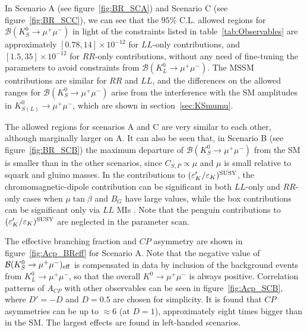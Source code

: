 In Scenario A (see figure~\ref{fig:BR_SCA}) and Scenario C (see figure~\ref{fig:BR_SCC}), we can see that the $95\%$ C.L. allowed regions for $\mathcal{B}(K_S^0\rightarrow\mu^+\mu^-)$ in light of the constraints listed in table~\ref{tab:Observables} are approximately $[0.78,14]\times 10^{-12}$ for $LL$-only contributions, and $[1.5,35]\times 10^{-12}$  for $RR$-only contributions, without any need of fine-tuning the parameters to avoid constraints from $\mathcal{B}(K_L^0\rightarrow\mu^+\mu^-)$. The MSSM contributions are similar for $RR$ and $LL$, and the differences on the allowed ranges for $\mathcal{B}(K_S^0\rightarrow\mu^+\mu^-)$ arise from  the interference with the SM amplitudes in $K_{S(L)}^0\rightarrow\mu^+\mu^-$, which are shown in section~\ref{sec:KSmumu}.

The allowed regions for scenarios A and C are very similar to each other, although marginally larger on A. It can also be seen that,  in Scenario B (see figure~\ref{fig:BR_SCB}) the maximum departure of $\mathcal{B}(K_S^0\rightarrow\mu^+\mu^-)$ from the SM is smaller than in the other scenarios, since $C_{S,P} \propto \mu$ and $\mu$ is small relative to squark and gluino masses. 
In the contributions to $(\varepsilon^{\prime}_K / \varepsilon_K)^{\rm SUSY}$, the chromomagnetic-dipole contribution can be significant in both $LL$-only and $RR$-only cases when $\mu \tan \beta $ and $B_G$ have large values, while the box contributions can be significant only via $LL$ MIs \cite{Kitahara:2016otd}. Note that the penguin contributions to  $(\varepsilon^{\prime}_K / \varepsilon_K)^{\rm SUSY}$ are neglected in the parameter scan.

The effective branching fraction and $CP$ asymmetry are shown in figure~\ref{fig:Acp_BReff} for Scenario A. Note that the negative value of ${\cal B}(K^0_S \rightarrow \mu^+ \mu^-)_{{\rm eff}}$ is compensated in data by inclusion of the background events from $K^0_L \rightarrow \mu^+ \mu^-$, so that the overall $K^0\rightarrow \mu^+\mu^-$ is always positive. Correlation patterns of $A_{CP}$ with other observables can be seen in figure~\ref{fig:Acp_SCB}, where $D' = -D$ and $D = 0.5$ are chosen for simplicity. It is found that $CP$ asymmetries can be up to $\approx 6$ (at $D = 1$), approximately eight times bigger than in the SM. The largest effects are found in left-handed scenarios.

